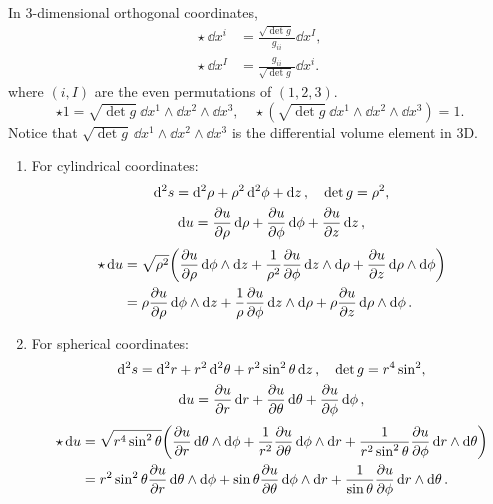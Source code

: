\documentclass[10pt]{article}
\begin{document}
	In 3-dimensional orthogonal coordinates,
	\begin{align}
		\star~\dd x^i &= \frac{\sqrt{\det g}~}{g_{ii}} \dd x^I, \\
		\star~\dd x^I &= \frac{g_{ii}}{\sqrt{\det g}~} \dd x^i.
	\end{align}
	where $(i, I)$ are the even permutations of $(1,2,3)$.
	\begin{equation}
		\star 1 = \sqrt{\det g}~\dd x^1 \wedge \dd x^2 \wedge \dd x^3, \quad
		\star (\sqrt{\det g}~\dd x^1 \wedge \dd x^2 \wedge \dd x^3) = 1.
	\end{equation}
	Notice that $\sqrt{\det g}~\dd x^1 \wedge \dd x^2 \wedge \dd x^3$ is the differential volume element in 3D.
	\begin{example}
		\begin{enumerate}
			\item For cylindrical coordinates:
			\begin{gather*}
				\dd[2]{s} = \dd[2]{\rho} + \rho^2 \dd[2]{\phi} + \dd{z}, \quad \det g = \rho^2, \\
				\dd{u} = \pdv{u}{\rho} \dd{\rho} + \pdv{u}{\phi} \dd{\phi} + \pdv{u}{z} \dd{z},
			\end{gather*}
			\begin{align*}
				\star \dd{u} &= \sqrt{\rho^2} \qty(\pdv{u}{\rho} \dd{\phi} \wedge \dd{z} + \frac{1}{\rho^2} \pdv{u}{\phi} \dd{z} \wedge \dd{\rho} + \pdv{u}{z} \dd{\rho} \wedge \dd{\phi}) \\
				&= \rho \pdv{u}{\rho} \dd{\phi} \wedge \dd{z} + \frac{1}{\rho} \pdv{u}{\phi} \dd{z} \wedge \dd{\rho} + \rho \pdv{u}{z} \dd{\rho} \wedge \dd{\phi}.
			\end{align*}
			\item For spherical coordinates:
			\begin{gather*}
				\dd[2]{s} = \dd[2]{r} + r^2 \dd[2]{\theta} + r^2 \sin^2{\theta} \dd{z}, \quad \det g = r^4 \sin^2, \\
				\dd{u} = \pdv{u}{r} \dd{r} + \pdv{u}{\theta} \dd{\theta} + \pdv{u}{\phi} \dd{\phi},
			\end{gather*}
			\begin{align*}
				\star \dd{u} &= \sqrt{r^4 \sin^2{\theta}} \qty(\pdv{u}{r} \dd{\theta} \wedge \dd{\phi} + \frac{1}{r^2} \pdv{u}{\theta} \dd{\phi} \wedge \dd{r} + \frac{1}{r^2 \sin^2 {\theta}} \pdv{u}{\phi} \dd{r} \wedge \dd{\theta}) \\
				&= r^2 \sin^2{\theta} \pdv{u}{r} \dd{\theta} \wedge \dd{\phi} + \sin{\theta} \pdv{u}{\theta} \dd{\phi} \wedge \dd{r} + \frac{1}{\sin{\theta}} \pdv{u}{\phi} \dd{r} \wedge \dd{\theta}.
			\end{align*}
		\end{enumerate}
	\end{example}
\end{document}

